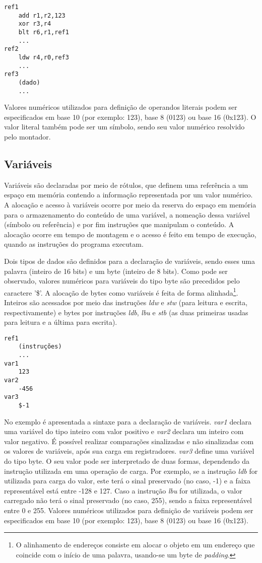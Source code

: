 \documentclass[11pt,a4paper]{report}
\begin{document}
\begin{verbatim}
ref1
    add r1,r2,123
    xor r3,r4
    blt r6,r1,ref1
    ...
ref2
    ldw r4,r0,ref3
    ...
ref3
    (dado)
    ...
\end{verbatim}

Valores numéricos utilizados para definição de operandos literais podem
ser especificados em base 10 (por exemplo: 123), base 8 (0123) ou base
16 (0x123). O valor literal também pode ser um símbolo, sendo seu valor
numérico resolvido pelo montador.

\subsection{Variáveis}

Variáveis são declaradas por meio de rótulos, que definem uma referência
a um espaço em memória contendo a informação representada por um valor
numérico. A alocação e acesso à variáveis ocorre por meio da reserva
do espaço em memória para o armazenamento do conteúdo de uma variável,
a nomeação dessa variável (símbolo ou referência) e por fim instruções
que manipulam o conteúdo. A alocação ocorre em tempo de montagem e o
acesso é feito em tempo de execução, quando as instruções do programa
executam.

Dois tipos de dados são definidos para a declaração de variáveis, sendo
esses uma palavra (inteiro de 16 bits) e um byte (inteiro de 8 bits).
Como pode ser observado, valores numéricos para variáveis do tipo byte
são precedidos pelo caractere '\$'. A alocação de bytes como variáveis
é feita de forma alinhada\footnote{O alinhamento de endereços consiste
em alocar o objeto em um endereço que coincide com o início de uma
palavra, usando-se um byte de \textit{padding}.}. Inteiros são acessados
por meio das instruções \textit{ldw} e \textit{stw} (para leitura e
escrita, respectivamente) e bytes por instruções \textit{ldb},
\textit{lbu} e \textit{stb} (as duas primeiras usadas para leitura e a
última para escrita).

\begin{verbatim}
ref1
    (instruções)
    ...
var1
    123
var2
    -456
var3
    $-1
\end{verbatim}

No exemplo é apresentada a sintaxe para a declaração de variáveis.
\textit{var1} declara uma variável do tipo inteiro com valor positivo e
\textit{var2} declara um inteiro com valor negativo. É possível realizar
comparações sinalizadas e não sinalizadas com os valores de variáveis,
após sua carga em registradores. \textit{var3} define uma variável do
tipo byte. O seu valor pode ser interpretado de duas formas, dependendo
da instrução utilizada em uma operação de carga. Por exemplo, se a 
instrução \textit{ldb} for utilizada para carga do valor, este
terá o sinal preservado (no caso, -1) e a faixa representável está entre
-128 e 127. Caso a instrução \textit{lbu} for utilizada, o valor carregado
não terá o sinal preservado (no caso, 255), sendo a faixa representável
entre 0 e 255. Valores numéricos utilizados para definição de variáveis
podem ser especificados em base 10 (por exemplo: 123), base 8 (0123) ou
base 16 (0x123).
\end{document}
